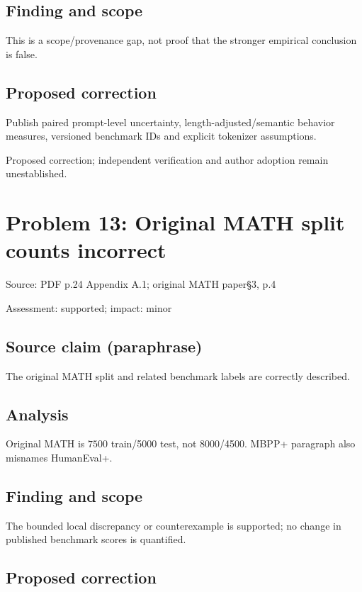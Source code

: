 \documentclass[11pt]{article}
\begin{document}
\subsection*{Finding and scope}

This is a scope/provenance gap, not proof that the stronger empirical conclusion is false.

\subsection*{Proposed correction}

Publish paired prompt-level uncertainty, length-adjusted/semantic behavior measures, versioned benchmark IDs and explicit tokenizer assumptions.

Proposed correction; independent verification and author adoption remain unestablished.

\section*{Problem 13: Original MATH split counts incorrect}

Source: PDF p.24 Appendix A.1; original MATH paper§3, p.4

Assessment: supported; impact: minor

\subsection*{Source claim (paraphrase)}

The original MATH split and related benchmark labels are correctly described.

\subsection*{Analysis}

Original MATH is \(7500\) train/5000 test, not \(8000\)/4500. MBPP+ paragraph also misnames HumanEval+.

\subsection*{Finding and scope}

The bounded local discrepancy or counterexample is supported; no change in published benchmark scores is quantified.

\subsection*{Proposed correction}
\end{document}

